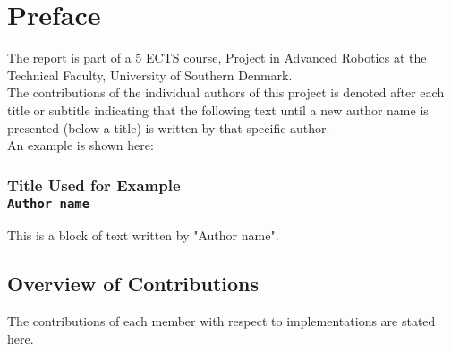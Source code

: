 \documentclass[../main.tex]{subfiles}
\begin{document}
\section*{Preface}
\label{sec:preface}

The report is part of a 5 ECTS course, Project in Advanced Robotics at the Technical Faculty, University of Southern Denmark.\\ 
The contributions of the individual authors of this project is denoted after each title or subtitle indicating that the following text until a new author name is presented (below a title) is written by that specific author.\\
An example is shown here:
\subsubsection*{Title Used for Example  \\ \normalfont\normalsize\texttt{Author name}}
This is a block of text written by "Author name".
\\

\subsection*{Overview of Contributions} 
The contributions of each member with respect to implementations are stated here.

\begin{table}[H]
\centering
{}
\end{table}
\end{document}
